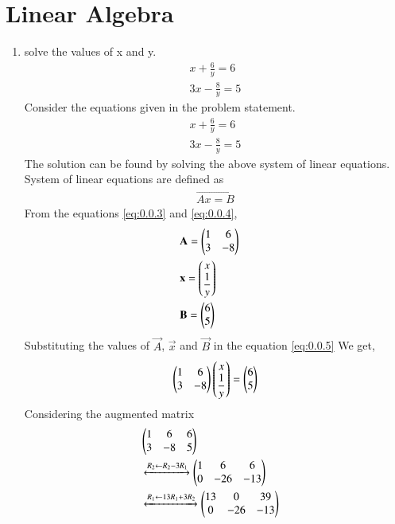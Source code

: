 \documentclass[journal,12pt,twocolumn]{IEEEtran}
\renewcommand\thesection{\arabic{section}}
\begin{document}
\section{Linear Algebra}
 \renewcommand{\theequation}{\theenumi}
\begin{enumerate}[label=\thesection.\arabic*.,ref=\thesection.\theenumi]
\item solve the values of x and y.
\begin{align}
&x+\displaystyle\frac{6}{y}=6 & \\ 
&3x-\displaystyle\frac{8}{y}=5&
\end{align}
\solution Consider the equations  given in the problem statement.
\begin{align}
&x+\displaystyle\frac{6}{y}=6 \label{eq:0.0.3} &\\
&3x-\displaystyle\frac{8}{y}=5 \label{eq:0.0.4} &
\end{align}
The solution can be found by solving the above system of linear equations.\\ 
System of linear equations are defined as 
\begin{align}
\vec{Ax=B}\label{eq:0.0.5}
\end{align}
From the equations \eqref{eq:0.0.3} and \eqref{eq:0.0.4}, 
\begin{align}
&\vec{A}= \myvec{1 &6\\3  & -8}&\\
\medskip
&\vec{x}= \myvec{ x\\ \displaystyle\frac{1}{y}}&\\
\medskip
&\vec{B}= \myvec{6\\5} & 
\end{align} 
Substituting the values of $\vec{A}$, $\vec{x}$ and $\vec{B}$ in the equation \eqref{eq:0.0.5}
We get,
\begin{align}
\begin{pmatrix}1&6\\3&-8\end{pmatrix} \begin{pmatrix}x\\\displaystyle\frac{1}{y}\end{pmatrix}= \begin{pmatrix}6\\5\end{pmatrix}
\end{align}
Considering the augmented matrix 
 \begin{align}
  &\myvec{1&6&6\\3&-8&5}&\\ 
& \xleftrightarrow[]{ R_2 \leftarrow R_2 - 3R_1}
  \myvec{1&6&6\\0&-26&-13}&\\
  & \xleftrightarrow[]{ R_1 \leftarrow 13R_1 + 3R_2}
  \myvec{13&0&39\\0&-26&-13}&\\

\end{align}
\end{enumerate}
\end{document}
